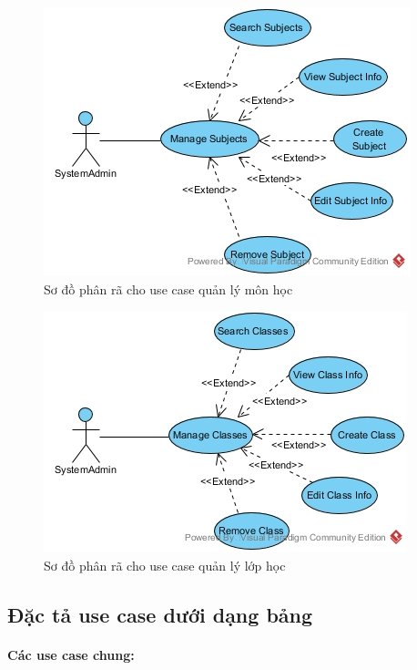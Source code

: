 \documentclass{article}
\begin{document}
  \begin{figure}[!ht]
    \centering
    \includegraphics[scale=0.7]{../pictures/projectdiagrams/Manage-Subjects-uc-desctructing.jpg}
    \caption{Sơ đồ phân rã cho use case quản lý môn học}
  \end{figure}

  \begin{figure}[!ht]
    \centering
    \includegraphics[scale=0.7]{../pictures/projectdiagrams/Manage-Classes-uc-destructing.jpg}
    \caption{Sơ đồ phân rã cho use case quản lý lớp học}
  \end{figure}

  \clearpage %
  \subsection{Đặc tả use case dưới dạng bảng}

  \paragraph{Các use case chung:}
\end{document}

